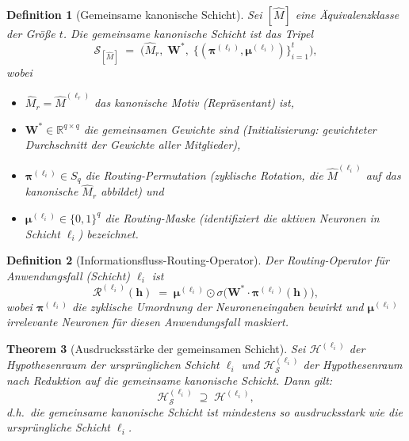 ﻿\documentclass[12pt, a4paper, openany]{report}
\newtheorem{theorem}{Theorem}[chapter]
\newtheorem{definition}[theorem]{Definition}
\newcommand{\R}{\mathbb{R}}
\newcommand{\calH}{\mathcal{H}}
\newcommand{\calR}{\mathcal{R}}
\newcommand{\calS}{\mathcal{S}}
\begin{document}
\begin{definition}[Gemeinsame kanonische Schicht]
\label{def:shared_layer}
Sei $[\hat{M}]$ eine Äquivalenzklasse der Größe $t$.  Die \emph{gemeinsame
kanonische Schicht} ist das Tripel
\[
  \calS_{[\hat{M}]}
  \;=\;
  \bigl(
    \hat{M}_r,\;
    \bm{W}^*,\;
    \bigl\{(\bm{\pi}^{(\ell_i)}, \bm{\mu}^{(\ell_i)})\bigr\}_{i=1}^{t}
  \bigr),
\]
wobei
\begin{itemize}
  \item $\hat{M}_r = \hat{M}^{(\ell_r)}$ das kanonische Motiv
    (Repräsentant) ist,
  \item $\bm{W}^* \in \R^{q \times q}$ die \emph{gemeinsamen Gewichte} sind
    (Initialisierung: gewichteter Durchschnitt der Gewichte aller Mitglieder),
  \item $\bm{\pi}^{(\ell_i)} \in S_q$ die \emph{Routing-Permutation}
    (zyklische Rotation, die $\hat{M}^{(\ell_i)}$ auf das kanonische $\hat{M}_r$
    abbildet) und
  \item $\bm{\mu}^{(\ell_i)} \in \{0,1\}^q$ die
    \emph{Routing-Maske} (identifiziert die aktiven Neuronen in Schicht $\ell_i$)
    bezeichnet.
\end{itemize}
\end{definition}

\begin{definition}[Informationsfluss-Routing-Operator]
\label{def:routing}
Der \emph{Routing-Operator} für Anwendungsfall (Schicht) $\ell_i$ ist
\begin{equation}
  \label{eq:routing_op}
  \calR^{(\ell_i)}(\bm{h})
  \;=\;
  \bm{\mu}^{(\ell_i)} \odot
  \sigma\!\bigl(\bm{W}^* \cdot \bm{\pi}^{(\ell_i)}(\bm{h})\bigr),
\end{equation}
wobei $\bm{\pi}^{(\ell_i)}$ die zyklische Umordnung der Neuroneneingaben
bewirkt und $\bm{\mu}^{(\ell_i)}$ irrelevante Neuronen für diesen
Anwendungsfall maskiert.
\end{definition}

\begin{theorem}[Ausdrucksstärke der gemeinsamen Schicht]
\label{thm:shared_expressivity}
Sei $\calH^{(\ell_i)}$ der Hypothesenraum der ursprünglichen Schicht $\ell_i$
und $\calH_{\calS}^{(\ell_i)}$ der Hypothesenraum nach Reduktion auf die
gemeinsame kanonische Schicht.  Dann gilt:
\begin{equation}
  \label{eq:expr_preservation}
  \calH_{\calS}^{(\ell_i)} \;\supseteq\; \calH^{(\ell_i)},
\end{equation}
d.h.\ die gemeinsame kanonische Schicht ist mindestens so ausdrucksstark wie
die ursprüngliche Schicht $\ell_i$.
\end{theorem}
\end{document}
